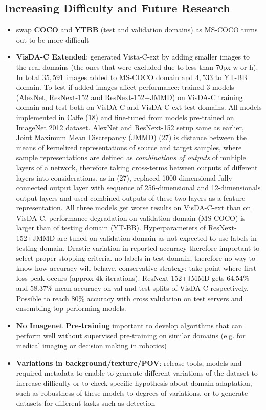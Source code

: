 \documentclass[]{article}
\begin{document}
\subsection{Increasing Difficulty and Future Research}
\begin{itemize}
	\item swap \textbf{COCO} and \textbf{YTBB} (test and validation domains) as MS-COCO turns out to be more difficult
	\item \textbf{VisDA-C Extended}: generated Vista-C-ext by adding smaller images to the real domains (the ones that were excluded due to less than 70px w or h). In total $35,591$ images added to MS-COCO domain and $4,533$ to YT-BB domain. To test if added images affect performance: trained 3 models (AlexNet, ResNext-152 and ResNext-152+JMMD) on VisDA-C training domain and test both on VisDA-C and VisDA-C-ext test domains. All models implemented in Caffe (18) and fine-tuned from models pre-trained on ImageNet 2012 dataset. AlexNet and ResNext-152 setup same as earlier, Joint Maximum Mean Discrepancy (JMMD) (27) is distance between the means of kernelized representations of source and target samples, where sample representations are defined as \textit{combinations of outputs} of multiple layers of a network, therefore taking cross-terms between outputs of different layers into considerations. as in (27), replaced 1000-dimensional fully connected output layer with sequence of 256-dimensional and 12-dimensionals output layers and used combined outputs of these two layers as a feature representation. All three models get worse results on VisDA-C-ext than on VisDA-C. performance degradation on validation domain (MS-COCO) is larger than of testing domain (YT-BB). Hyperparameters of ResNext-152+JMMD are tuned on validation domain as not expected to use labels in testing domain. Drastic variation in reported accuracy therefore important to select proper stopping criteria. no labels in test domain, therefore no way to know how accuracy will behave. conservative strategy: take point where first loss peak occurs (approx 4k iterations). ResNext-152+JMMD gets $64.54\%$ and $58.37\%$ mean accuracy on val and test splits of VisDA-C respectively. Possible to reach $80\%$ accuracy with cross validation on test servers and ensembling top performing models.
	\item \textbf{No Imagenet Pre-training} important to develop algorithms that can perform well without supervised pre-training on similar domains (e.g. for medical imaging or decision making in robotics)
	\item \textbf{Variations in background/texture/POV}: release tools, models and required metadata to enable to generate different variations of the dataset to increase difficulty or to check specific hypothesis about domain adaptation, such as robustness of these models to degrees of variations, or to generate datasets for different tasks such as detection	
\end{itemize}
\end{document}
